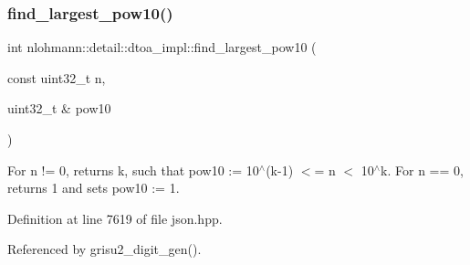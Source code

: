 \subsubsection{\texorpdfstring{find\+\_\+largest\+\_\+pow10()}{find\_largest\_pow10()}}
{\footnotesize\ttfamily int nlohmann\+::detail\+::dtoa\+\_\+impl\+::find\+\_\+largest\+\_\+pow10 (\begin{DoxyParamCaption}\item[{const uint32\+\_\+t}]{n,  }\item[{uint32\+\_\+t \&}]{pow10 }\end{DoxyParamCaption})\hspace{0.3cm}{\ttfamily [inline]}}

For n != 0, returns k, such that pow10 \+:= 10$^\wedge$(k-\/1) $<$= n $<$ 10$^\wedge$k. For n == 0, returns 1 and sets pow10 \+:= 1. 

Definition at line 7619 of file json.\+hpp.



Referenced by grisu2\+\_\+digit\+\_\+gen().


